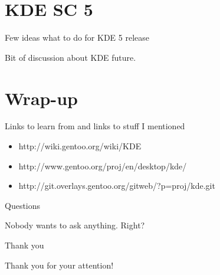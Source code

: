 \documentclass{beamer}
\begin{document}
\section{KDE SC 5}
\begin{frame}{Few ideas what to do for KDE 5 release}
	\begin{center}Bit of discussion about KDE future.\end{center}
\end{frame}

\section{Wrap-up}

\begin{frame}{Links to learn from and links to stuff I mentioned}
	\begin{itemize}
		\item http://wiki.gentoo.org/wiki/KDE
		\item http://www.gentoo.org/proj/en/desktop/kde/
		\item http://git.overlays.gentoo.org/gitweb/?p=proj/kde.git
	\end{itemize}
\end{frame}

\begin{frame}{Questions}
	\begin{center}Nobody wants to ask anything. Right?\end{center}
\end{frame}

\begin{frame}{Thank you}
	\begin{center}Thank you for your attention!\end{center}
\end{frame}
\end{document}
